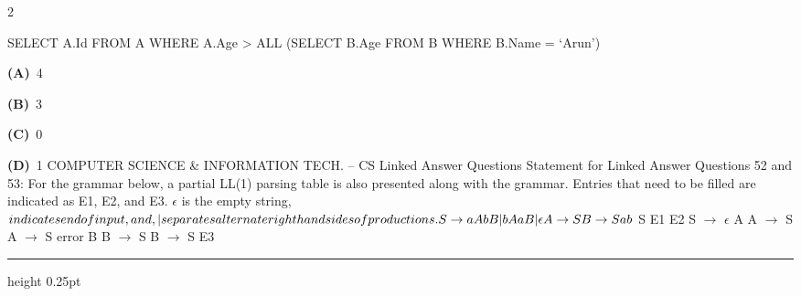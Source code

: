 \documentclass[a4paper,10pt,twoside]{article}
\begin{document}
\begin{multicols}{2}
{SELECT A.Id
FROM A
WHERE A.Age > ALL (SELECT B.Age
FROM B
WHERE B.Name = `Arun') \par}
\par\vspace{2pt}\noindent
\textbf{(A)}~4\par\vspace{2pt}\noindent
\textbf{(B)}~3\par\vspace{2pt}\noindent
\textbf{(C)}~0\par\vspace{2pt}\noindent
\textbf{(D)}~1  COMPUTER SCIENCE \& INFORMATION TECH. -- CS \newline  \newline Linked Answer Questions \newline Statement for Linked Answer Questions 52 and 53: \newline  \newline For the grammar below, a partial LL(1) parsing table is also presented along with the grammar. Entries that \newline need to be filled are indicated as E1, E2, and E3. $\epsilon$ is the empty string, $ indicates end of input, and, | \newline separates alternate right hand sides of productions. \newline  \newline S \to  a A b B | b A a B | \epsilon  \newline A \to  S \newline B \to  S \newline a \newline b \newline $ \newline S \newline E1 \newline E2 \newline S $\to$ $\epsilon$ \newline A \newline A $\to$ S \newline A $\to$ S \newline error \newline B \newline B $\to$ S \newline B $\to$ S \newline E3
\par\vspace{6pt}\hrule height 0.25pt\vspace{6pt}

\end{multicols}
\end{document}
